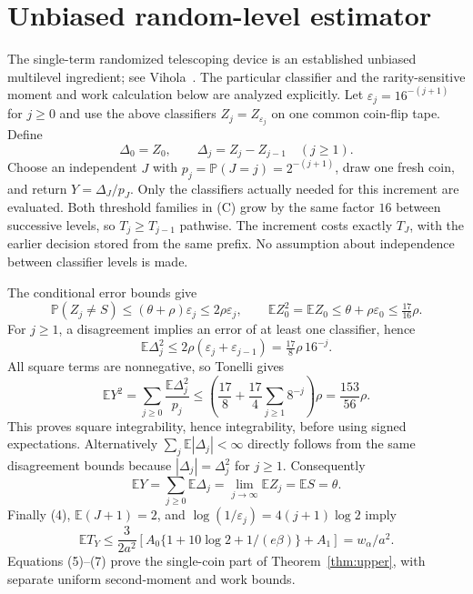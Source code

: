 \documentclass[11pt]{article}
\newcommand{\E}{\mathbb E}
\newcommand{\Pp}{\mathbb P}
\begin{document}
\section{Unbiased random-level estimator}
The single-term randomized telescoping device is an established unbiased
multilevel ingredient; see Vihola~\cite[Theorem 3]{vihola}. The particular classifier and
the rarity-sensitive moment and work calculation below are analyzed explicitly.
Let $\varepsilon_j=16^{-(j+1)}$ for $j\ge0$ and use the above classifiers
$Z_j=Z_{\varepsilon_j}$ on one common coin-flip tape. Define
\[
 \Delta_0=Z_0,\qquad \Delta_j=Z_j-Z_{j-1}\quad(j\ge1).
\]
Choose an independent $J$ with $p_j=\Pp(J=j)=2^{-(j+1)}$, draw one fresh coin,
and return $Y=\Delta_J/p_J$. Only the classifiers actually needed for this
increment are evaluated. Both threshold families in (C) grow by the same
factor $16$ between successive levels, so $T_j\ge T_{j-1}$ pathwise. The
increment costs exactly $T_J$, with the earlier decision stored from the same
prefix. No assumption about independence between classifier levels is made.

The conditional error bounds give
\[
 \Pp(Z_j\ne S)\le (\theta+\rho)\varepsilon_j\le2\rho\varepsilon_j,
 \qquad \E Z_0^2=\E Z_0\le\theta+\rho\varepsilon_0\le\tfrac{17}{16}\rho.
\]
For $j\ge1$, a disagreement implies an error of at least one classifier, hence
\[
 \E\Delta_j^2\le2\rho(\varepsilon_j+\varepsilon_{j-1})
                    =\tfrac{17}{8}\rho\,16^{-j}.
\]
All square terms are nonnegative, so Tonelli gives
\[
 \E Y^2=\sum_{j\ge0}\frac{\E\Delta_j^2}{p_j}
 \le\left(\frac{17}{8}+\frac{17}{4}\sum_{j\ge1}8^{-j}\right)\rho
 =\frac{153}{56}\rho.                                  \tag{5}
\]
This proves square integrability, hence integrability, before using signed
expectations. Alternatively $\sum_j\E|\Delta_j|<\infty$ directly follows
from the same disagreement bounds because $|\Delta_j|=\Delta_j^2$ for $j\ge1$.
Consequently
\[
 \E Y=\sum_{j\ge0}\E\Delta_j
       =\lim_{j\to\infty}\E Z_j=\E S=\theta.             \tag{6}
\]
Finally (4), $\E(J+1)=2$, and $\log(1/\varepsilon_j)=4(j+1)\log2$ imply
\[
 \E T_Y\le\frac3{2a^2}
 \left[A_0\{1+10\log2+1/(e\beta)\}+A_1\right]
 =w_\alpha/a^2.                                         \tag{7}
\]
Equations (5)--(7) prove the single-coin part of Theorem~\ref{thm:upper}, with
separate uniform second-moment and work bounds.
\end{document}
